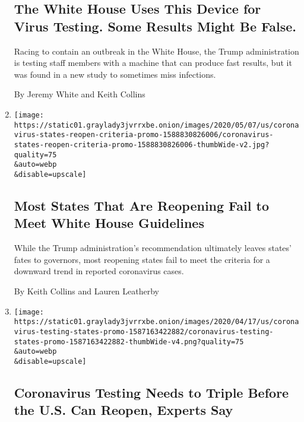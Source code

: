 \begin{enumerate}
  \hypertarget{the-white-house-uses-this-device-for-virus-testing-some-results-might-be-false}{%
  \subsection{The White House Uses This Device for Virus Testing. Some
  Results Might Be
  False.}\label{the-white-house-uses-this-device-for-virus-testing-some-results-might-be-false}}

  Racing to contain an outbreak in the White House, the Trump
  administration is testing staff members with a machine that can
  produce fast results, but it was found in a new study to sometimes
  miss infections.

  By Jeremy White and Keith Collins
\item
  \href{/interactive/2020/05/07/us/coronavirus-states-reopen-criteria.html}{}

  \texttt{[image: https://static01.graylady3jvrrxbe.onion/images/2020/05/07/us/coronavirus-states-reopen-criteria-promo-1588830826006/coronavirus-states-reopen-criteria-promo-1588830826006-thumbWide-v2.jpg?quality=75\\\&auto=webp\\\&disable=upscale]}

  \hypertarget{most-states-that-are-reopening-fail-to-meet-white-house-guidelines}{%
  \subsection{Most States That Are Reopening Fail to Meet White House
  Guidelines}\label{most-states-that-are-reopening-fail-to-meet-white-house-guidelines}}

  While the Trump administration's recommendation ultimately leaves
  states' fates to governors, most reopening states fail to meet the
  criteria for a downward trend in reported coronavirus cases.

  By Keith Collins and Lauren Leatherby
\item
  \href{/interactive/2020/04/17/us/coronavirus-testing-states.html}{}

  \texttt{[image: https://static01.graylady3jvrrxbe.onion/images/2020/04/17/us/coronavirus-testing-states-promo-1587163422882/coronavirus-testing-states-promo-1587163422882-thumbWide-v4.png?quality=75\\\&auto=webp\\\&disable=upscale]}

  \hypertarget{coronavirus-testing-needs-to-triple-before-the-us-can-reopen-experts-say}{%
  \subsection{Coronavirus Testing Needs to Triple Before the U.S. Can
  Reopen, Experts
  Say}\label{coronavirus-testing-needs-to-triple-before-the-us-can-reopen-experts-say}}


\end{enumerate}
